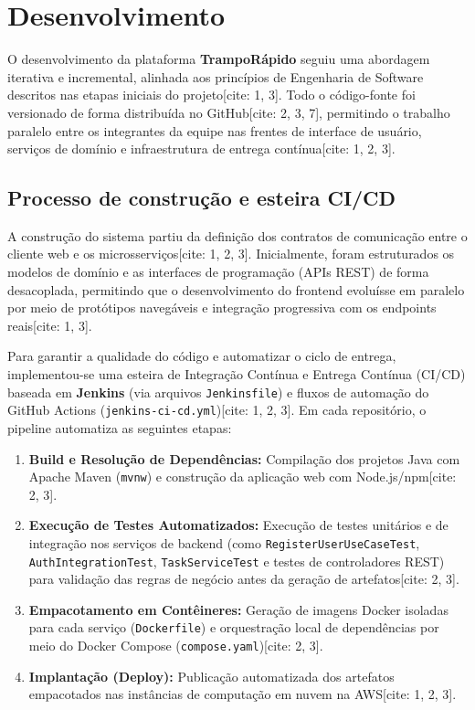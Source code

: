 \documentclass[
    12pt,
    oneside,
    a4paper,
    brazil
]{abntex2}
\begin{document}

\chapter{Desenvolvimento}

O desenvolvimento da plataforma \textbf{TrampoRápido} seguiu uma abordagem iterativa e incremental, alinhada aos princípios de Engenharia de Software descritos nas etapas iniciais do projeto[cite: 1, 3]. Todo o código-fonte foi versionado de forma distribuída no GitHub[cite: 2, 3, 7], permitindo o trabalho paralelo entre os integrantes da equipe nas frentes de interface de usuário, serviços de domínio e infraestrutura de entrega contínua[cite: 1, 2, 3].

\section{Processo de construção e esteira CI/CD}

A construção do sistema partiu da definição dos contratos de comunicação entre o cliente web e os microsserviços[cite: 1, 2, 3]. Inicialmente, foram estruturados os modelos de domínio e as interfaces de programação (APIs REST) de forma desacoplada, permitindo que o desenvolvimento do frontend evoluísse em paralelo por meio de protótipos navegáveis e integração progressiva com os endpoints reais[cite: 1, 3].

Para garantir a qualidade do código e automatizar o ciclo de entrega, implementou-se uma esteira de Integração Contínua e Entrega Contínua (CI/CD) baseada em \textbf{Jenkins} (via arquivos \texttt{Jenkinsfile}) e fluxos de automação do GitHub Actions (\texttt{jenkins-ci-cd.yml})[cite: 1, 2, 3]. Em cada repositório, o pipeline automatiza as seguintes etapas:

\begin{enumerate}
    \item \textbf{Build e Resolução de Dependências:} Compilação dos projetos Java com Apache Maven (\texttt{mvnw}) e construção da aplicação web com Node.js/npm[cite: 2, 3].
    \item \textbf{Execução de Testes Automatizados:} Execução de testes unitários e de integração nos serviços de backend (como \texttt{RegisterUserUseCaseTest}, \texttt{AuthIntegrationTest}, \texttt{TaskServiceTest} e testes de controladores REST) para validação das regras de negócio antes da geração de artefatos[cite: 2, 3].
    \item \textbf{Empacotamento em Contêineres:} Geração de imagens Docker isoladas para cada serviço (\texttt{Dockerfile}) e orquestração local de dependências por meio do Docker Compose (\texttt{compose.yaml})[cite: 2, 3].
    \item \textbf{Implantação (Deploy):} Publicação automatizada dos artefatos empacotados nas instâncias de computação em nuvem na AWS[cite: 1, 2, 3].
\end{enumerate}
\end{document}
